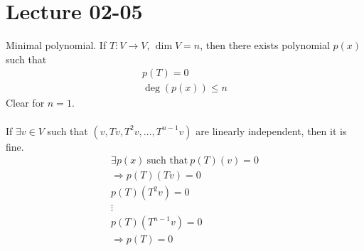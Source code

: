 \documentclass[class=scrartcl, crop=false]{standalone}
\date{2020-02-05}
\begin{document}
\section{Lecture 02-05}

Minimal polynomial. If $T: V \to V$, $\dim V = n$, then there exists polynomial $p(x)$ such that 
\begin{gather*}
  p(T) = 0 \\
  \deg(p(x)) \leq n
\end{gather*} 
Clear for $n = 1$.
\\\\
If $ \exists v \in V$ such that $(v, Tv, T^2v, \dots, T^{n - 1}v)$ are linearly independent, then it is fine.
\begin{gather*}
  \exists p(x) \ \text{such that} \ p(T)(v) = 0 \\
  \Rightarrow p(T)(Tv) = 0 \\
  p(T)(T^2v) = 0 \\
  \vdots \\
  p(T)(T^{n - 1}v) = 0 \\
  \Rightarrow p(T) = 0
\end{gather*} 
\end{document}
